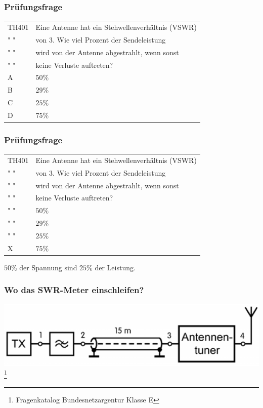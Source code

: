\begin{frame}
    \frametitle{Prüfungsfrage}
    \begin{center}
    \begin{tabular}{l||l}\hline
        TH401&Eine Antenne hat ein Stehwellenverhältnis (VSWR)\\
         " "  &von 3. Wie viel Prozent der Sendeleistung\\
         " "  &wird von der Antenne abgestrahlt, wenn sonst\\
         " "  &keine Verluste auftreten?\\ \hline\hline
         A & $50 \%$ \\\hline
         B & $29 \%$ \\\hline
         C & $25 \%$ \\ \hline
         D & $75 \%$\\\hline
    \end{tabular}
 	\end{center}
\end{frame}

\begin{frame}
    \frametitle{Prüfungsfrage}
    \begin{center}
    \begin{tabular}{l||l}\hline
        TH401&Eine Antenne hat ein Stehwellenverhältnis (VSWR)\\
         " "  &von 3. Wie viel Prozent der Sendeleistung\\
         " "  &wird von der Antenne abgestrahlt, wenn sonst\\
         " "  &keine Verluste auftreten?\\ \hline\hline
         " " & $50 \%$ \\\hline
         " " & $29 \%$ \\\hline
         " " & $25 \%$ \\ \hline
         X & $75 \%$\\\hline
    \end{tabular}
    $50 \%$ der Spannung sind $25 \%$ der Leistung.
 	\end{center}
\end{frame}

\begin{frame}
    \frametitle{Wo das SWR-Meter einschleifen?}
        \includegraphics[width=.97\textwidth]{e17/SWROrt.png}
        \footnote{\tiny Fragenkatalog Bundesnetzargentur Klasse E}
\end{frame}

